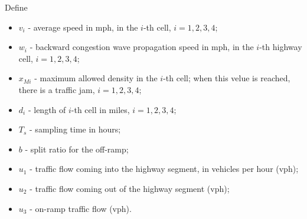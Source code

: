 \documentclass[letterpaper,10pt,english]{sphinxmanual}
\begin{document}
Define
\begin{itemize}
\item {} 
$v_i$ - average speed in mph, in the $i$-th cell,
$i=1,2,3,4$;

\item {} 
$w_i$ - backward congestion wave propagation speed in mph, in
the $i$-th highway cell, $i=1,2,3,4$;

\item {} 
$x_{Mi}$ - maximum allowed density in the $i$-th cell;
when this velue is reached, there is a traffic jam,
$i=1,2,3,4$;

\item {} 
$d_i$ - length of $i$-th cell in miles,
$i=1,2,3,4$;

\item {} 
$T_s$ - sampling time in hours;

\item {} 
$b$ - split ratio for the off-ramp;

\item {} 
$u_1$ - traffic flow coming into the highway segment, in
vehicles per hour (vph);

\item {} 
$u_2$ - traffic flow coming out of the highway segment (vph);

\item {} 
$u_3$ - on-ramp traffic flow (vph).

\end{itemize}
\end{document}
